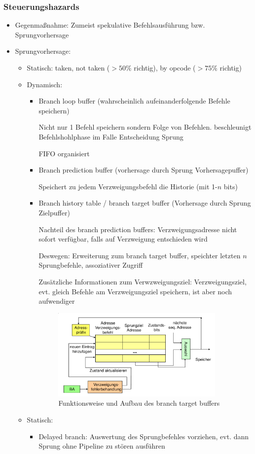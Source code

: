 \subsubsection{Steuerungshazards}
\begin{itemize}
	\item
		Gegenmaßnahme: Zumeist spekulative Befehlsausführung bzw. Sprungvorhersage
	\item
		Sprungvorhersage:
		\begin{itemize}
			\item
				Statisch: taken, not taken ($>50\%$ richtig), by opcode ($>75\%$ richtig)
			\item
				Dynamisch:
				\begin{itemize}
					\item
						Branch loop buffer (wahrscheinlich aufeinanderfolgende Befehle speichern)

						Nicht nur 1 Befehl speichern sondern Folge von Befehlen. beschleunigt Befehlshohlphase im Falle Entscheidung Sprung

						FIFO organisiert
					\item
						Branch prediction buffer (vorhersage durch Sprung Vorhersagepuffer)

						Speichert zu jedem Verzweigungsbefehl die Historie (mit 1-$n$ bits)
					\item
						Branch history table / branch target buffer (Vorhersage durch Sprung Zielpuffer)
						
						Nachteil des branch prediction buffers: Verzweigungsadresse nicht sofort verfügbar, falls auf Verzweigung entschieden wird

						Deswegen: Erweiterung zum branch target buffer, speichter letzten $n$ Sprungbefehle, assoziativer Zugriff

						Zusätzliche Informationen zum Verwzweigungsziel: Verzweigungsziel, evt. gleich Befehle am Verzweigungsziel speichern, ist aber noch aufwendiger
						\begin{figure}[hpbt]
							\centering
							\includegraphics[width=0.9\textwidth]{img/branchtargetbuffer.png}
							\caption{Funktionsweise und Aufbau des branch target buffers}
							\label{fig:hazards}
						\end{figure}
				\end{itemize}
			\item
				Statisch:
				\begin{itemize}
					\item
						Delayed branch: Auswertung des Sprungbefehles vorziehen, evt. dann Sprung ohne Pipeline zu stören ausführen


\end{itemize}
\end{itemize}
\end{itemize}
